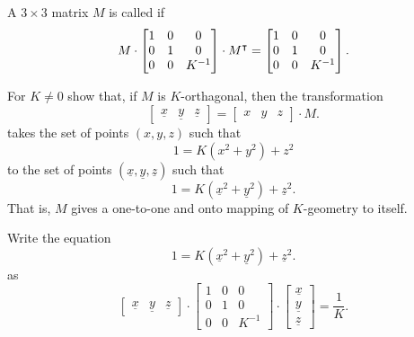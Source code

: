 \documentclass{ximera}
\begin{document}
\begin{definition}
A $3\times3$ matrix $M$ is called  if
\[
M\cdot\begin{bmatrix}
1 & 0 & 0\\
0 & 1 & 0\\
0 & 0 & K^{-1}%
\end{bmatrix}  \cdot M^\transpose=\begin{bmatrix}
1 & 0 & 0\\
0 & 1 & 0\\
0 & 0 & K^{-1}%
\end{bmatrix}.
\]
\end{definition}



\begin{problem}
  For $K\ne 0$ show that, if $M$ is $K$-orthagonal, then the transformation
  \[
  \begin{bmatrix}
    \underline{x} & \underline{y} & \underline{z}
  \end{bmatrix}
  =
  \begin{bmatrix}
    x & y & z
  \end{bmatrix}
  \cdot M.
  \]
  takes the set of points $\left(x,y,z\right)$ such
  that
\[
1 = K\left(x^2 + y^2\right) +z^2
\]
to the set of points
$\left(\underline{x},\underline{y},\underline{z}\right)$
such that
\[
1=K\left(\underline{x}^2 + \underline{y}^{2}\right) + \underline{z}^{2}.
\]
That is, $M$ gives a one-to-one and onto mapping of $K$-geometry to
itself.
\begin{hint}
  Write the equation
  \[
  1=K\left(\underline{x}^2 + \underline{y}^{2}\right) + \underline{z}^{2}.
  \]
  as
\[
\begin{bmatrix}
\underline{x} & \underline{y} & \underline{z}%
\end{bmatrix}  \cdot\begin{bmatrix}
1 & 0 & 0\\
0 & 1 & 0\\
0 & 0 & K^{-1}%
\end{bmatrix}  \cdot
\begin{bmatrix}
\underline{x}\\
\underline{y}\\
\underline{z}%
\end{bmatrix}  =\frac{1}{K}.
\]
\end{hint}


\end{problem}
\end{document}
